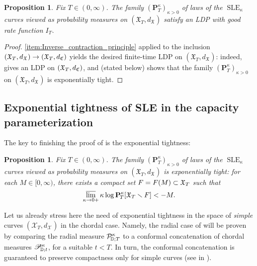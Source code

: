 \documentclass[a4paper, 11pt]{article}
\newtheorem{prop}[thm]{Proposition}
\theoremstyle{definition}
\numberwithin{equation}{section}
\numberwithin{figure}{section}
\renewcommand{\limsup}{\varlimsup}
\newcommand{\SLE}[1][]{\operatorname{SLE}_{#1}}
\newcommand{\Xlenergy}[1][]{I_{#1}}
\newcommand{\Hpaths}[1][]{\mathscr{X}_{#1}} %
\newcommand{\Xpaths}[1][]{\mathfrak{X}_{#1}}
\newcommand{\dCcompsets}{d_{\Ccompsets}}
\newcommand{\dHpaths}[1][]{d_{\!\Hpaths[#1]}}
\newcommand{\dXpaths}[1][]{d_{\Xpaths[#1]}}
\newcommand{\rDmeasure}[2][]{\mathcal{P}^{#2}_{\!\bD;#1}}
\newcommand{\cDmeasure}[2][]{\mathscr{P}^{#2}_{\!\bD;#1}}
\newcommand{\Xmeasure}[2][]{\mathbf{P}^{#2}_{\!#1}}
\begin{document}
\begin{prop}\label{thm:radial-LDP-finite}
Fix $T \in (0,\infty)$. 
The family $(\Xmeasure[T]{\kappa})_{\kappa > 0}$ of laws of the $\SLE[\kappa]$ curves viewed as probability measures on $(\Xpaths[T],\dXpaths)$ 
satisfy an LDP with good rate function $\Xlenergy[T]$. 
\end{prop}

\begin{proof} 
\ref{item:Inverse_contraction_principle} 
applied to the inclusion $(\Xpaths[T],\dXpaths) \to (\Xpaths[T],\dCcompsets)$ 
yields the desired finite-time LDP on $(\Xpaths[T],\dXpaths)$: indeed, 
 gives an LDP on $(\Xpaths[T],\dCcompsets)$, 
and  (stated below) shows that the family 
$(\Xmeasure[T]{\kappa})_{\kappa > 0}$ on $(\Xpaths[T],\dXpaths)$ is exponentially tight. 
\end{proof}


\subsection{Exponential tightness of SLE in the capacity parameterization}\label{subsec:exponential-tightness-outline}

The key to finishing the proof of  
is the exponential tightness:  

\begin{prop} \label{thm:exponential-tightness}
Fix $T \in (0,\infty)$. 
The family $(\Xmeasure[T]{\kappa})_{\kappa > 0}$ of laws of the $\SLE[\kappa]$ curves viewed as probability measures on $(\Xpaths[T],\dXpaths)$ is exponentially tight:
for each $M \in [0,\infty)$, there exists a compact set $\compact = \compact(M) \subset \Xpaths[T]$ such that
\begin{align*}
\limsup_{\kappa \to 0+}\kappa\log\Xmeasure[T]{\kappa}[\Xpaths[T] \smallsetminus \compact] < -M.
\end{align*}
\end{prop}


Let us already stress here the need of exponential tightness in the space of \emph{simple} curves $(\Hpaths[T], \dHpaths)$ in the chordal case. 
Namely, the radial case of  will be proven by comparing the radial measure $\rDmeasure[T]{\kappa}$ to a conformal concatenation of chordal measures $\cDmeasure[t]{\kappa}$, for a suitable $t < T$. 
In turn, the conformal concatenation is guaranteed to preserve compactness only for simple curves (see  in ).
\end{document}
